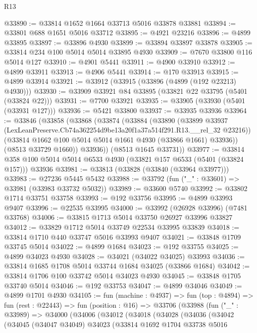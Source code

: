 \begin{lexlean}{R13}
\begin{coremodule}
@33890 := @33814 @1652 @1664 @33713 @5016 @33878 @33881
@33894 := @33801 @688 @1651 @5016 @33712
@33895 := @4921 @23216
@33896 := @4899 @33895
@33897 := @33896 @4930
@33899 := @33894 @33897 @33878
@33905 := @33814 @234 @100 @5014 @5014 @33895 @4930
@33909 := @7670 @33800 @116 @5014 @127
@33910 := @4901 @5441
@33911 := @4900 @33910
@33912 := @4899 @33911
@33913 := @4906 @5441
@33914 := @170 @33913
@33915 := @4899 @33914
@33921 := @33912 (@33915 (@33896 (@4899 (@192 @23213) @4930)))
@33930 := @33909 @33921 @84 @33895 (@33821 @22 @33795 (@5401 (@33824 @22)))
@33931 := @7700 @33921
@33935 := @33905 (@33930 (@5401 (@33931 @127)))
@33936 := @5421 @33800
@33937 := @33935 @33936
@33964 := @33846
    (@33858
      (@33868
        (@33874
          (@33884
            (@33890
              (@33899
                @33937
                (LexLeanPreserve.Cb74a362254d9be13a20f1a37a514f291.R13.__rel_32 @23216))
              (@33814 @1662 @100 @5014 @5014 @1661 @4930 (@33866 @1661) @33936))
            (@8513 @33729 @1660))
          @33936))
      (@8513 @1645 @33731))
@33977 := @33814 @358 @100 @5014 @5014 @6533 @4930 (@33821 @157 @6533 (@5401 (@33824 @157))) @33936
@33981 := @33813 (@33828 (@33840 (@33964 @33977)))
@33983 := @27236 @5445 @5432
@33988 := @33792 (fun ("_" : @33601) => @33981 (@33983 @33732 @5032))
@33989 := @33600 @5740
@33992 := @33802 @1714 @33751 @33758
@33993 := @192 @33756
@33995 := @4899 @33993 @9407
@33996 := @22535 @33995
@34000 := @33992 (@26928 @33996) (@7481 @33768)
@34006 := @33815 @1713 @5014 @33750 @26927 @33996 @33827
@34012 := @33829 @1712 @5014 @33749 @22534 @33995 @33839
@34018 := @33814 @1710 @440 @33747 @5016 @33993 @9407
@34021 := @33848 @1709 @33745 @5014
@34022 := @4899 @1684
@34023 := @192 @33755
@34025 := @4899 @34023 @4930
@34028 := @34021 (@34022 @34025) @33993
@34036 := @33814 @1685 @1708 @5014 @33744 @1684 @34025 (@33866 @1684)
@34042 := @33814 @1706 @100 @33742 @5014 @34023 @4930
@34045 := @33848 @1705 @33740 @5014
@34046 := @192 @33753
@34047 := @4899 @34046
@34049 := @4899 @1701 @4930
@34105 := fun (machine : @4937) =>
  fun (top : @4894) =>
  fun (rest : @22443) =>
  fun (position : @16) =>
  @33706
    (@33988
      (fun ("_" : @33989) =>
      @34000
        (@34006
          (@34012
            (@34018
              (@34028
                (@34036
                  (@34042
                    (@34045
                      (@34047 @34049)
                      @34023
                      (@33814
                        @1692
                        @1704
                        @33738
                        @5016

\end{coremodule}
\end{lexlean}
